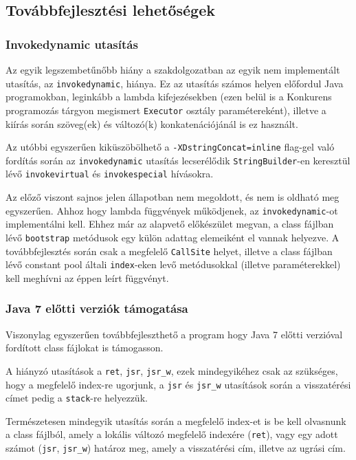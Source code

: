 \subsection{Továbbfejlesztési lehetőségek}

\subsubsection{Invokedynamic utasítás}

Az egyik legszembetűnőbb hiány a szakdolgozatban az egyik nem implementált utasítás, az \lstinline{invokedynamic}, hiánya.
Ez az utasítás számos helyen előfordul Java programokban, leginkább a lambda kifejezésekben (ezen belül is a Konkurens programozás tárgyon megismert \lstinline{Executor} osztály paramétereként), illetve a kiírás során szöveg(ek) és változó(k) konkatenációjánál is ez használt.

Az utóbbi egyszerűen kiküszöbölhető a \lstinline{-XDstringConcat=inline} flag-gel való fordítás során az \lstinline{invokedynamic} utasítás lecserélődik \lstinline{StringBuilder}-en keresztül lévő \lstinline{invokevirtual} és \lstinline{invokespecial} hívásokra.

Az előző viszont sajnos jelen állapotban nem megoldott, és nem is oldható meg egyszerűen. Ahhoz hogy lambda függvények működjenek, az \lstinline{invokedynamic}-ot implementálni kell. Ehhez már az alapvető előkészület megvan, a class fájlban lévő \lstinline{bootstrap} metódusok egy külön adattag elemeiként el vannak helyezve. A továbbfejlesztés során csak a megfelelő \lstinline{CallSite} helyet, illetve a class fájlban lévő constant pool általi \lstinline{index}-eken levő metódusokkal (illetve paraméterekkel) kell meghívni az éppen leírt függvényt.

\subsubsection{Java 7 előtti verziók támogatása}

Viszonylag egyszerűen továbbfejleszthető a program hogy Java 7 előtti verzióval fordított class fájlokat is támogasson.

A hiányzó utasítások a \lstinline{ret}, \lstinline{jsr}, \lstinline{jsr_w}, ezek mindegyikéhez csak az szükséges, hogy a megfelelő index-re ugorjunk, a \lstinline{jsr} és \lstinline{jsr_w} utasítások során a visszatérési címet pedig a \lstinline{stack}-re helyezzük.

Természetesen mindegyik utasítás során a megfelelő index-et is be kell olvasnunk a class fájlból, amely a lokális változó megfelelő indexére (\lstinline{ret}), vagy egy adott számot (\lstinline{jsr}, \lstinline{jsr_w}) határoz meg, amely a visszatérési cím, illetve az ugrási cím.

